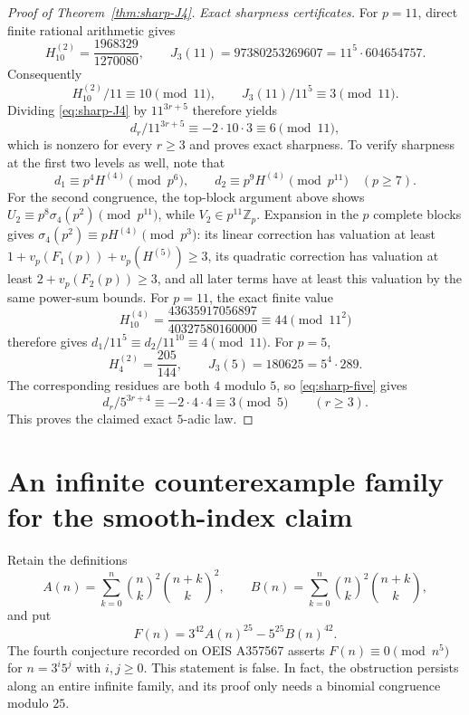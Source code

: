 \documentclass[11pt]{amsart}
\theoremstyle{definition}
\theoremstyle{remark}
\begin{document}
\begin{proof}[Proof of Theorem~\ref{thm:sharp-J4}]
\emph{Exact sharpness certificates.}
For $p=11$, direct finite rational arithmetic gives
\[
H_{10}^{(2)}=\frac{1968329}{1270080},\qquad
J_3(11)=97380253269607=11^5\cdot604654757.
\]
Consequently
\[
H_{10}^{(2)}/11\equiv10\pmod{11},\qquad
J_3(11)/11^5\equiv3\pmod{11}.
\]
Dividing \eqref{eq:sharp-J4} by $11^{3r+5}$ therefore yields
\[
d_r/11^{3r+5}\equiv-2\cdot10\cdot3\equiv6\pmod{11},
\]
which is nonzero for every $r\ge3$ and proves exact sharpness.
To verify sharpness at the first two levels as well, note that
\[
d_1\equiv p^4H^{(4)}\pmod{p^6},\qquad
 d_2\equiv p^9H^{(4)}\pmod{p^{11}}\quad(p\ge7).
\]
For the second congruence, the top-block argument above shows
$U_2\equiv p^8\sigma_4(p^2)\pmod{p^{11}}$, while $V_2\in p^{11}\mathbb Z_p$.
Expansion in the $p$ complete blocks gives
$\sigma_4(p^2)\equiv pH^{(4)}\pmod{p^3}$: its linear correction
has valuation at least $1+v_p(F_1(p))+v_p(H^{(5)})\ge3$,
its quadratic correction has valuation at least
$2+v_p(F_2(p))\ge3$, and all later terms have at least this valuation
by the same power-sum bounds.
For $p=11$, the exact finite value
\[
H_{10}^{(4)}=\frac{43635917056897}{40327580160000}
\equiv44\pmod{11^2}
\]
therefore gives $d_1/11^5\equiv d_2/11^{10}\equiv4\pmod{11}$.
For $p=5$,
\[
H_4^{(2)}=\frac{205}{144},\qquad J_3(5)=180625=5^4\cdot289.
\]
The corresponding residues are both $4$ modulo $5$, so
\eqref{eq:sharp-five} gives
\[
d_r/5^{3r+4}\equiv-2\cdot4\cdot4\equiv3\pmod5
\qquad(r\ge3).
\]
This proves the claimed exact $5$-adic law.
\end{proof}

\section{An infinite counterexample family for the smooth-index claim}

Retain the definitions
\[
 A(n)=\sum_{k=0}^n\binom nk^2\binom{n+k}k^2,
 \qquad
 B(n)=\sum_{k=0}^n\binom nk^2\binom{n+k}k,
\]
and put
\[
 F(n)=3^{42}A(n)^{25}-5^{25}B(n)^{42}.
\]
The fourth conjecture recorded on OEIS A357567 \cite{A357567} asserts
$F(n)\equiv0\pmod{n^5}$ for $n=3^i5^j$ with $i,j\ge0$.
This statement is false. In fact, the obstruction persists along an entire
infinite family, and its proof only needs a binomial congruence modulo $25$.
\end{document}
